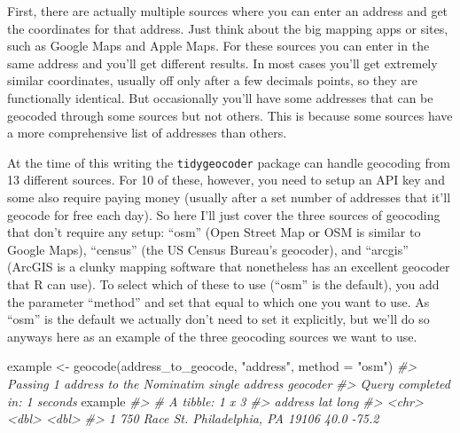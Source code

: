 \documentclass[
]{krantz}
\makeatletter
\newenvironment{Shaded}{\begin{snugshade}}{\end{snugshade}}
\newcommand{\AttributeTok}[1]{\textcolor[rgb]{0.61,0.61,0.61}{#1}}
\newcommand{\CommentTok}[1]{\textcolor[rgb]{0.37,0.37,0.37}{\textit{#1}}}
\newcommand{\FunctionTok}[1]{\textcolor[rgb]{0,0,0}{#1}}
\newcommand{\NormalTok}[1]{#1}
\newcommand{\OtherTok}[1]{\textcolor[rgb]{0.37,0.37,0.37}{#1}}
\newcommand{\StringTok}[1]{\textcolor[rgb]{0.5,0.5,0.5}{#1}}
\newenvironment{kframe}{%
\medskip{}
\setlength{\fboxsep}{.8em}
 \def\at@end@of@kframe{}%
 \ifinner\ifhmode%
  \def\at@end@of@kframe{\end{minipage}}%
  \begin{minipage}{\columnwidth}%
 \fi\fi%
 \def\FrameCommand##1{\hskip\@totalleftmargin \hskip-\fboxsep
 \colorbox{shadecolor}{##1}\hskip-\fboxsep
     \hskip-\linewidth \hskip-\@totalleftmargin \hskip\columnwidth}%
 \MakeFramed {\advance\hsize-\width
   \@totalleftmargin\z@ \linewidth\hsize
   \@setminipage}}%
 {\par\unskip\endMakeFramed%
 \at@end@of@kframe}
\renewenvironment{Shaded}{\begin{kframe}}{\end{kframe}}
\makeatother
\begin{document}
First, there are actually multiple sources where you can
enter an address and get the coordinates for that address.
Just think about the big mapping apps or sites, such as
Google Maps and Apple Maps. For these sources you can enter
in the same address and you'll get different results. In
most cases you'll get extremely similar coordinates, usually
off only after a few decimals points, so they are
functionally identical. But occasionally you'll have some
addresses that can be geocoded through some sources but not
others. This is because some sources have a more
comprehensive list of addresses than others.

At the time of this writing the \texttt{tidygeocoder}
package can handle geocoding from 13 different sources. For
10 of these, however, you need to setup an API key and some
also require paying money (usually after a set number of
addresses that it'll geocode for free each day). So here
I'll just cover the three sources of geocoding that don't
require any setup: ``osm'' (Open Street Map or OSM is
similar to Google Maps), ``census'' (the US Census Bureau's
geocoder), and ``arcgis'' (ArcGIS is a clunky mapping
software that nonetheless has an excellent geocoder that R
can use). To select which of these to use (``osm'' is the
default), you add the parameter ``method'' and set that
equal to which one you want to use. As ``osm'' is the
default we actually don't need to set it explicitly, but
we'll do so anyways here as an example of the three
geocoding sources we want to use.

\begin{Shaded}
\begin{Highlighting}[]
\NormalTok{example }\OtherTok{\textless{}{-}} \FunctionTok{geocode}\NormalTok{(address\_to\_geocode, }\StringTok{"address"}\NormalTok{, }\AttributeTok{method =} \StringTok{"osm"}\NormalTok{)}
\CommentTok{\#\textgreater{} Passing 1 address to the Nominatim single address geocoder}
\CommentTok{\#\textgreater{} Query completed in: 1 seconds}
\NormalTok{example}
\CommentTok{\#\textgreater{} \# A tibble: 1 x 3}
\CommentTok{\#\textgreater{}   address                               lat  long}
\CommentTok{\#\textgreater{}   \textless{}chr\textgreater{}                               \textless{}dbl\textgreater{} \textless{}dbl\textgreater{}}
\CommentTok{\#\textgreater{} 1 750 Race St. Philadelphia, PA 19106  40.0 {-}75.2}
\end{Highlighting}
\end{Shaded}
\end{document}
